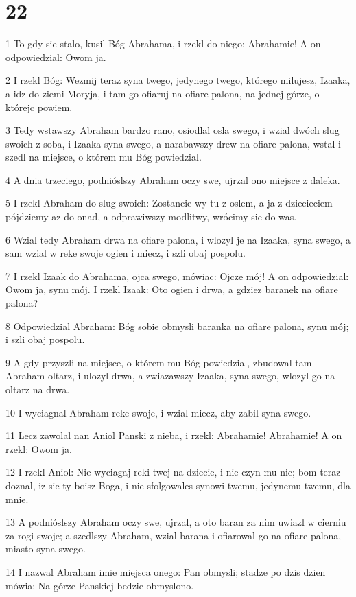 \chapter{22}

\par 1 To gdy sie stalo, kusil Bóg Abrahama, i rzekl do niego: Abrahamie! A on odpowiedzial: Owom ja.
\par 2 I rzekl Bóg: Wezmij teraz syna twego, jedynego twego, którego milujesz, Izaaka, a idz do ziemi Moryja, i tam go ofiaruj na ofiare palona, na jednej górze, o którejc powiem.
\par 3 Tedy wstawszy Abraham bardzo rano, osiodlal osla swego, i wzial dwóch slug swoich z soba, i Izaaka syna swego, a narabawszy drew na ofiare palona, wstal i szedl na miejsce, o którem mu Bóg powiedzial.
\par 4 A dnia trzeciego, podnióslszy Abraham oczy swe, ujrzal ono miejsce z daleka.
\par 5 I rzekl Abraham do slug swoich: Zostancie wy tu z oslem, a ja z dziecieciem pójdziemy az do onad, a odprawiwszy modlitwy, wrócimy sie do was.
\par 6 Wzial tedy Abraham drwa na ofiare palona, i wlozyl je na Izaaka, syna swego, a sam wzial w reke swoje ogien i miecz, i szli obaj pospolu.
\par 7 I rzekl Izaak do Abrahama, ojca swego, mówiac: Ojcze mój! A on odpowiedzial: Owom ja, synu mój. I rzekl Izaak: Oto ogien i drwa, a gdziez baranek na ofiare palona?
\par 8 Odpowiedzial Abraham: Bóg sobie obmysli baranka na ofiare palona, synu mój; i szli obaj pospolu.
\par 9 A gdy przyszli na miejsce, o którem mu Bóg powiedzial, zbudowal tam Abraham oltarz, i ulozyl drwa, a zwiazawszy Izaaka, syna swego, wlozyl go na oltarz na drwa.
\par 10 I wyciagnal Abraham reke swoje, i wzial miecz, aby zabil syna swego.
\par 11 Lecz zawolal nan Aniol Panski z nieba, i rzekl: Abrahamie! Abrahamie! A on rzekl: Owom ja.
\par 12 I rzekl Aniol: Nie wyciagaj reki twej na dziecie, i nie czyn mu nic; bom teraz doznal, iz sie ty boisz Boga, i nie sfolgowales synowi twemu, jedynemu twemu, dla mnie.
\par 13 A podnióslszy Abraham oczy swe, ujrzal, a oto baran za nim uwiazl w cierniu za rogi swoje; a szedlszy Abraham, wzial barana i ofiarowal go na ofiare palona, miasto syna swego.
\par 14 I nazwal Abraham imie miejsca onego: Pan obmysli; stadze po dzis dzien mówia: Na górze Panskiej bedzie obmyslono.
